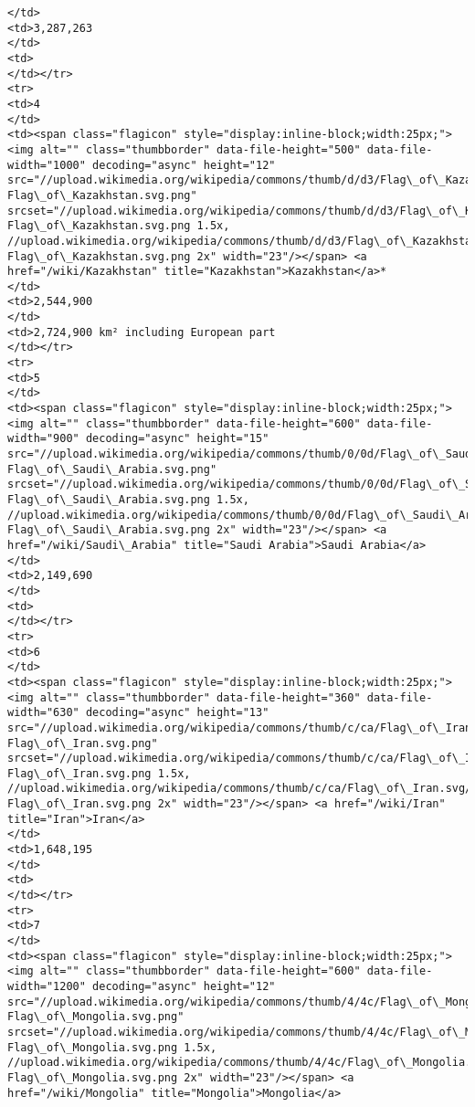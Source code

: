 \documentclass[11pt]{article}
\begin{document}
\begin{Verbatim}[commandchars=\\\{\}]
</td>
<td>3,287,263
</td>
<td>
</td></tr>
<tr>
<td>4
</td>
<td><span class="flagicon" style="display:inline-block;width:25px;"><img alt="" class="thumbborder" data-file-height="500" data-file-width="1000" decoding="async" height="12" src="//upload.wikimedia.org/wikipedia/commons/thumb/d/d3/Flag\_of\_Kazakhstan.svg/23px-Flag\_of\_Kazakhstan.svg.png" srcset="//upload.wikimedia.org/wikipedia/commons/thumb/d/d3/Flag\_of\_Kazakhstan.svg/35px-Flag\_of\_Kazakhstan.svg.png 1.5x, //upload.wikimedia.org/wikipedia/commons/thumb/d/d3/Flag\_of\_Kazakhstan.svg/46px-Flag\_of\_Kazakhstan.svg.png 2x" width="23"/></span> <a href="/wiki/Kazakhstan" title="Kazakhstan">Kazakhstan</a>*
</td>
<td>2,544,900
</td>
<td>2,724,900 km² including European part
</td></tr>
<tr>
<td>5
</td>
<td><span class="flagicon" style="display:inline-block;width:25px;"><img alt="" class="thumbborder" data-file-height="600" data-file-width="900" decoding="async" height="15" src="//upload.wikimedia.org/wikipedia/commons/thumb/0/0d/Flag\_of\_Saudi\_Arabia.svg/23px-Flag\_of\_Saudi\_Arabia.svg.png" srcset="//upload.wikimedia.org/wikipedia/commons/thumb/0/0d/Flag\_of\_Saudi\_Arabia.svg/35px-Flag\_of\_Saudi\_Arabia.svg.png 1.5x, //upload.wikimedia.org/wikipedia/commons/thumb/0/0d/Flag\_of\_Saudi\_Arabia.svg/45px-Flag\_of\_Saudi\_Arabia.svg.png 2x" width="23"/></span> <a href="/wiki/Saudi\_Arabia" title="Saudi Arabia">Saudi Arabia</a>
</td>
<td>2,149,690
</td>
<td>
</td></tr>
<tr>
<td>6
</td>
<td><span class="flagicon" style="display:inline-block;width:25px;"><img alt="" class="thumbborder" data-file-height="360" data-file-width="630" decoding="async" height="13" src="//upload.wikimedia.org/wikipedia/commons/thumb/c/ca/Flag\_of\_Iran.svg/23px-Flag\_of\_Iran.svg.png" srcset="//upload.wikimedia.org/wikipedia/commons/thumb/c/ca/Flag\_of\_Iran.svg/35px-Flag\_of\_Iran.svg.png 1.5x, //upload.wikimedia.org/wikipedia/commons/thumb/c/ca/Flag\_of\_Iran.svg/46px-Flag\_of\_Iran.svg.png 2x" width="23"/></span> <a href="/wiki/Iran" title="Iran">Iran</a>
</td>
<td>1,648,195
</td>
<td>
</td></tr>
<tr>
<td>7
</td>
<td><span class="flagicon" style="display:inline-block;width:25px;"><img alt="" class="thumbborder" data-file-height="600" data-file-width="1200" decoding="async" height="12" src="//upload.wikimedia.org/wikipedia/commons/thumb/4/4c/Flag\_of\_Mongolia.svg/23px-Flag\_of\_Mongolia.svg.png" srcset="//upload.wikimedia.org/wikipedia/commons/thumb/4/4c/Flag\_of\_Mongolia.svg/35px-Flag\_of\_Mongolia.svg.png 1.5x, //upload.wikimedia.org/wikipedia/commons/thumb/4/4c/Flag\_of\_Mongolia.svg/46px-Flag\_of\_Mongolia.svg.png 2x" width="23"/></span> <a href="/wiki/Mongolia" title="Mongolia">Mongolia</a>

\end{Verbatim}
\end{document}

